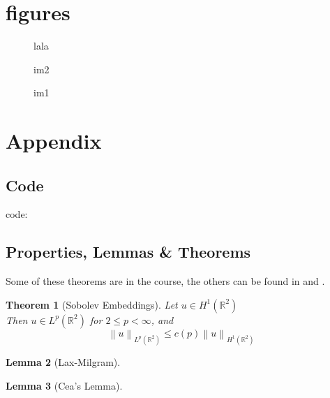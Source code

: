 \documentclass[conference]{IEEEtran}
\newcommand{\norm}[1]{\left\lVert#1\right\rVert}
\newtheorem{theorem}{Theorem}[section]
\newtheorem{lemma}[theorem]{Lemma}
\begin{document}
\section{figures}

\begin{figure}[!ht]
\centering 
\caption{lala}
\label{fig:fig7}
\end{figure}

\begin{figure}[!ht]
\centering 
\begin{minipage}[t]{4cm} 
\centering 
\caption{im2} 
\label{fig:fig8}
\end{minipage} 
\begin{minipage}[t]{4cm} 
\centering 
\caption{im1}
\label{fig:fig9}
\end{minipage} 
\end{figure}

\section{Appendix}\label{sec:appendix}
\subsection{Code}
code: 
\subsection{Properties, Lemmas \& Theorems}
Some of these theorems are in the course, the others can be found in \cite{Salsa} and \cite{Perotto}. \\
\begin{theorem}[Sobolev Embeddings\cite{Salsa}]
\label{th:sob}
Let $ u \in H^1(\mathbb{R}^2)$ \\
Then $u \in L^p(\mathbb{R}^2)$ for $2 \leq p < \infty$, and
$$\norm{u}_{L^p(\mathbb{R}^2)} \leq c(p) \norm{u}_{H^1(\mathbb{R}^2)} $$
\end{theorem}
\begin{lemma}[Lax-Milgram]
\label{th:laxMilgram}

\end{lemma}

\begin{lemma}[Cea's Lemma]
\label{th:cea}

\end{lemma}
\end{document}
